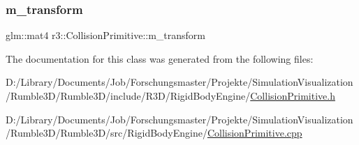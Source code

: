 \mbox{\label{classr3_1_1_collision_primitive_a0cb28517e7791b9836a5cac5d8550b13}} 
\subsubsection{\texorpdfstring{m\+\_\+transform}{m\_transform}}
{\footnotesize\ttfamily glm\+::mat4 r3\+::\+Collision\+Primitive\+::m\+\_\+transform\hspace{0.3cm}{\ttfamily [protected]}}



The documentation for this class was generated from the following files\+:\begin{DoxyCompactItemize}
\item 
D\+:/\+Library/\+Documents/\+Job/\+Forschungsmaster/\+Projekte/\+Simulation\+Visualization/\+Rumble3\+D/\+Rumble3\+D/include/\+R3\+D/\+Rigid\+Body\+Engine/\mbox{\hyperlink{_collision_primitive_8h}{Collision\+Primitive.\+h}}\item 
D\+:/\+Library/\+Documents/\+Job/\+Forschungsmaster/\+Projekte/\+Simulation\+Visualization/\+Rumble3\+D/\+Rumble3\+D/src/\+Rigid\+Body\+Engine/\mbox{\hyperlink{_collision_primitive_8cpp}{Collision\+Primitive.\+cpp}}\end{DoxyCompactItemize}
